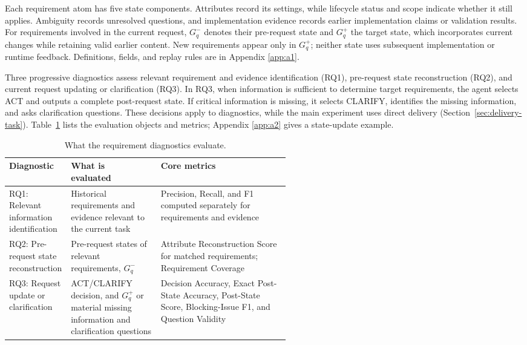 \documentclass{article} %
\begin{document}
Each requirement atom has five state components. Attributes record its settings, while lifecycle status and scope indicate whether it still applies. Ambiguity records unresolved questions, and implementation evidence records earlier implementation claims or validation results. For requirements involved in the current request, $G_q^-$ denotes their pre-request state and $G_q^+$ the target state, which incorporates current changes while retaining valid earlier content. New requirements appear only in $G_q^+$; neither state uses subsequent implementation or runtime feedback. Definitions, fields, and replay rules are in Appendix \ref{app:a1}.

Three progressive diagnostics assess relevant requirement and evidence identification (RQ1), pre-request state reconstruction (RQ2), and current request updating or clarification (RQ3). In RQ3, when information is sufficient to determine target requirements, the agent selects ACT and outputs a complete post-request state. If critical information is missing, it selects CLARIFY, identifies the missing information, and asks clarification questions. These decisions apply to diagnostics, while the main experiment uses direct delivery (Section~\ref{sec:delivery-task}). Table~\ref{tab:diagnostic-questions} lists the evaluation objects and metrics; Appendix \ref{app:a2} gives a state-update example.

\begin{table}[htbp]
\centering\small
\setlength{\tabcolsep}{3pt}
\renewcommand{\arraystretch}{1.08}
\caption{What the requirement diagnostics evaluate.}
\label{tab:diagnostic-questions}
\begin{tabularx}{\linewidth}{@{}>{\raggedright\arraybackslash}p{0.22\linewidth}>{\raggedright\arraybackslash}p{0.32\linewidth}>{\raggedright\arraybackslash}X@{}}
\toprule
Diagnostic & \shortstack[c]{What is\\evaluated} & Core metrics \\
\midrule
RQ1: Relevant information identification & Historical requirements and evidence relevant to the current task & Precision, Recall, and F1 computed separately for requirements and evidence \\
RQ2: Pre-request state reconstruction & Pre-request states of relevant requirements, $G_q^-$ & Attribute Reconstruction Score for matched requirements; Requirement Coverage \\
RQ3: Request update or clarification & ACT/CLARIFY decision, and $G_q^+$ or material missing information and clarification questions & Decision Accuracy, Exact Post-State Accuracy, Post-State Score, Blocking-Issue F1, and Question Validity \\
\bottomrule
\end{tabularx}
\end{table}
\end{document}
